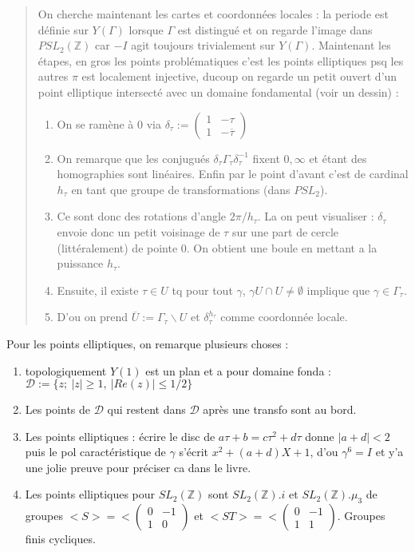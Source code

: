 \documentclass[12pt]{article}
\theoremstyle{plain}
\theoremstyle{definition}
\theoremstyle{remark}
\newcommand{\Z}{\mathbb{Z}}
\newcommand{\D}{\mathcal{D}}
\begin{document}
\begin{abstract}
    On cherche maintenant les cartes et coordonnées locales : la periode est définie sur $Y(\Gamma)$ lorsque $\Gamma$ est distingué et on regarde 
    l'image dans $PSL_2(\Z)$ car $-I$ agit toujours trivialement sur $Y(\Gamma)$. Maintenant les étapes, en gros les points problématiques
    c'est les points elliptiques psq les autres $\pi$ est localement injective, ducoup on regarde un petit ouvert d'un point elliptique intersecté
    avec un domaine fondamental (voir un dessin) :
    \begin{enumerate}
        \item On se ramène à $0$ via $\delta_{\tau}:=\begin{pmatrix} 1 &-\tau\\ 1 & -\overline{\tau}\end{pmatrix}$
        \item On remarque que les conjugués $\delta_{\tau}\Gamma_{\tau}\delta_{\tau}^{-1}$ fixent $0,\infty$ et 
        étant des homographies sont linéaires. Enfin par le point d'avant c'est de cardinal $h_{\tau}$ en tant que 
        groupe de transformations (dans $PSL_2$).
        \item Ce sont donc des rotations d'angle $2\pi/h_{\tau}$. La on peut visualiser : $\delta_{\tau}$ envoie donc 
        un petit voisinage de $\tau$ sur une part de cercle (littéralement) de pointe $0$. On obtient une boule en mettant a la puissance
        $h_{\tau}$.
        \item Ensuite, il existe $\tau\in U$ tq pour tout $\gamma$, $\gamma U\cap U\ne\emptyset$ implique que $\gamma\in\Gamma_{\tau}$.
        \item D'ou on prend $\overline{U}:=\Gamma_{\tau}\backslash U$ et $\delta_{\tau}^{h_{\tau}}$ comme coordonnée locale.
    \end{enumerate}
\end{abstract}

Pour les points elliptiques, on remarque plusieurs choses :
\begin{enumerate}
    \item topologiquement $Y(1)$ est un plan et a pour domaine fonda : $\D:=\{z;~\lvert z\rvert\geq 1,~\lvert Re(z)\rvert \leq 1/2\}$
    \item Les points de $\D$ qui restent dans $\D$ après une transfo sont au bord.
    \item Les points elliptiques : écrire le disc de $a\tau+b=c\tau^2+d\tau$ donne $\lvert a+d\rvert<2$ puis
    le pol caractéristique de $\gamma$ s'écrit $x^2+(a+d)X+1$, d'ou $\gamma^6=I$ et y'a une jolie preuve pour préciser ca dans le livre.
    \item Les points elliptiques pour $SL_2(\Z)$ sont $SL_2(\Z).i$ et $SL_2(\Z).\mu_3$ de groupes $<S>=<\begin{pmatrix}0&-1\\1&0 \end{pmatrix}$
    et $<ST>=<\begin{pmatrix}0&-1\\ 1&1 \end{pmatrix}$. Groupes finis cycliques.
\end{enumerate}
\end{document}

